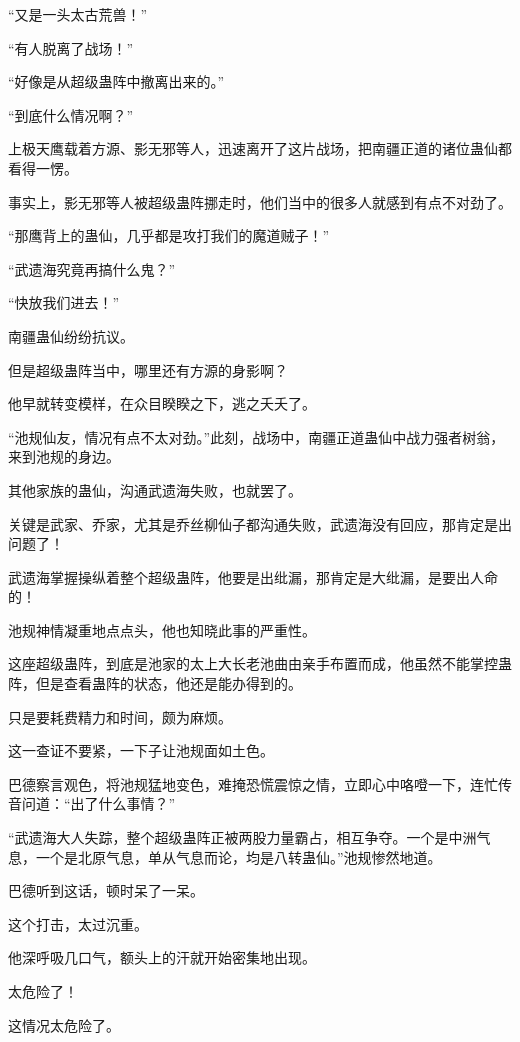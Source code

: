 
\begin{this_body}

“又是一头太古荒兽！”

“有人脱离了战场！”

“好像是从超级蛊阵中撤离出来的。”

“到底什么情况啊？”

上极天鹰载着方源、影无邪等人，迅速离开了这片战场，把南疆正道的诸位蛊仙都看得一愣。

事实上，影无邪等人被超级蛊阵挪走时，他们当中的很多人就感到有点不对劲了。

“那鹰背上的蛊仙，几乎都是攻打我们的魔道贼子！”

“武遗海究竟再搞什么鬼？”

“快放我们进去！”

南疆蛊仙纷纷抗议。

但是超级蛊阵当中，哪里还有方源的身影啊？

他早就转变模样，在众目睽睽之下，逃之夭夭了。

“池规仙友，情况有点不太对劲。”此刻，战场中，南疆正道蛊仙中战力强者树翁，来到池规的身边。

其他家族的蛊仙，沟通武遗海失败，也就罢了。

关键是武家、乔家，尤其是乔丝柳仙子都沟通失败，武遗海没有回应，那肯定是出问题了！

武遗海掌握操纵着整个超级蛊阵，他要是出纰漏，那肯定是大纰漏，是要出人命的！

池规神情凝重地点点头，他也知晓此事的严重性。

这座超级蛊阵，到底是池家的太上大长老池曲由亲手布置而成，他虽然不能掌控蛊阵，但是查看蛊阵的状态，他还是能办得到的。

只是要耗费精力和时间，颇为麻烦。

这一查证不要紧，一下子让池规面如土色。

巴德察言观色，将池规猛地变色，难掩恐慌震惊之情，立即心中咯噔一下，连忙传音问道：“出了什么事情？”

“武遗海大人失踪，整个超级蛊阵正被两股力量霸占，相互争夺。一个是中洲气息，一个是北原气息，单从气息而论，均是八转蛊仙。”池规惨然地道。

巴德听到这话，顿时呆了一呆。

这个打击，太过沉重。

他深呼吸几口气，额头上的汗就开始密集地出现。

太危险了！

这情况太危险了。


\end{this_body}
